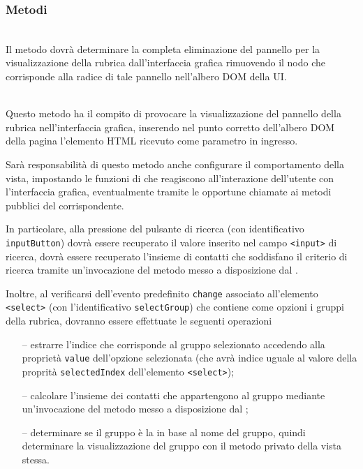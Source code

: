 \subsubsection*{Metodi}
\begin{description}

\item{}\\
Il metodo dovrà determinare la completa eliminazione del pannello per la visualizzazione della rubrica dall'interfaccia grafica rimuovendo il nodo che corrisponde alla radice di tale pannello nell'albero DOM della UI\@.

\item{}\\
Questo metodo ha il compito di provocare la visualizzazione del pannello della rubrica nell'interfaccia grafica, inserendo nel punto corretto dell'albero DOM della pagina l'elemento HTML ricevuto come parametro in ingresso.

Sarà responsabilità di questo metodo anche configurare il comportamento della vista, impostando le funzioni di  che reagiscono all'interazione dell'utente con l'interfaccia grafica, eventualmente tramite le opportune chiamate ai metodi pubblici del  corrispondente.

In particolare, alla pressione del pulsante di ricerca (con identificativo \verb'inputButton') dovrà essere recuperato il valore inserito nel campo \verb'<input>' di ricerca, dovrà essere recuperato l'insieme di contatti che soddisfano il criterio di ricerca tramite un'invocazione del metodo  messo a disposizione dal .

Inoltre, al verificarsi dell'evento predefinito \verb'change' associato all'elemento  \verb'<select>' (con l'identificativo \verb'selectGroup') che contiene come opzioni i gruppi della rubrica, dovranno essere effettuate le seguenti operazioni
\begin{itemize}
  \item[--] estrarre l'indice che corrisponde al gruppo selezionato accedendo alla proprietà \verb'value' dell'opzione selezionata (che avrà indice uguale al valore della proprità \verb'selectedIndex' dell'elemento \verb'<select>');
  \item[--] calcolare l'insieme dei contatti che appartengono al gruppo mediante un'invocazione del metodo  messo a disposizione dal ;
  \item[--] determinare se il gruppo è la  in base al nome del gruppo, quindi determinare la visualizzazione del gruppo con il metodo privato  della vista stessa.
\end{itemize}


\end{description}

